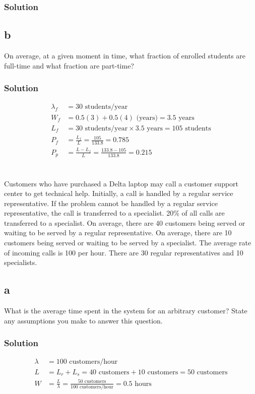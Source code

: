 \documentclass{amsart}
\begin{document}
\subsubsection*{Solution}

\subsection*{b}
On average, at a given moment in time, what fraction of enrolled students are
full-time and what fraction are part-time?

\subsubsection*{Solution}
\begin{align}
\lambda_f &= 30\text{ students/year}\\
  W_f &=0.5(3) + 0.5(4)\text{ (years)}
     = 3.5 \text{ years} \\
  L_f &= 30\text{ students/year} \times 3.5 \text{ years} = 105\text{ students}\\
  P_f &= \frac{L_f}{L}=\frac{105}{133.8} = 0.785\\
  P_p &= \frac{L-L_f}{L}=\frac{133.8-105}{133.8} = 0.215
\end{align}

\section{} %
Customers who have purchased a Delta laptop may call a customer support center to get
technical help. Initially, a call is handled by a regular service representative. If the
problem cannot be handled by a regular service representative, the call is transferred to a
specialist. 20\% of all calls are transferred to a specialist. On average, there are 40
customers being served or waiting to be served by a regular representative. On average,
there are 10 customers being served or waiting to be served by a specialist. The average
rate of incoming calls is 100 per hour. There are 30 regular representatives and 10
specialists.

\subsection*{a}
What is the average time spent in the system for an arbitrary customer? State any
assumptions you make to answer this question.
\subsubsection*{Solution}
\begin{align}
  \lambda &= 100\text{ customers/hour}\\
  L &= L_r + L_s = 40\text{ customers}+10\text{ customers}=50\text{ customers} \\
  W &= \frac{L}{\lambda} =\frac{50\text{ customers}}{100\text{ customers/hour}}=0.5\text{ hours}
\end{align}
\end{document}
